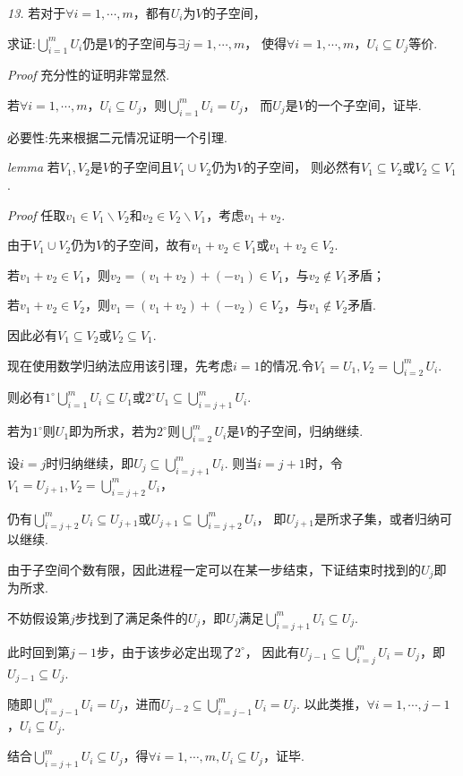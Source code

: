 \textit{13.}
若对于\(\forall i=1,\cdots,m\)，都有\(U_i\)为\(V\)的子空间，

求证:\(\bigcup_{i=1}^m U_i\)仍是\(V\)的子空间与\(\exists j=1,\cdots,m\)，
使得\(\forall i=1,\cdots,m\)，\(U_i \subseteq U_j\)等价.

\textit{Proof}
充分性的证明非常显然.

若\(\forall i=1,\cdots,m\)，\(U_i \subseteq U_j\)，则\(\bigcup_{i=1}^m U_i=U_j\)，
而\(U_j\)是\(V\)的一个子空间，证毕.

必要性:先来根据二元情况证明一个引理.

\textit{lemma}
若\(V_1,V_2\)是\(V\)的子空间且\(V_1 \cup V_2\)仍为\(V\)的子空间，
则必然有\(V_1 \subseteq V_2\)或\(V_2 \subseteq V_1\).

\textit{Proof}
任取\(v_1 \in V_1 \backslash V_2\)和\(v_2 \in V_2 \backslash V_1\)，考虑\(v_1+v_2\).

由于\(V_1 \cup V_2\)仍为\(V\)的子空间，故有\(v_1+v_2 \in V_1\)或\(v_1+v_2 \in V_2\).

若\(v_1+v_2 \in V_1\)，则\(v_2=(v_1+v_2)+(-v_1) \in V_1\)，与\(v_2 \notin V_1\)矛盾；

若\(v_1+v_2 \in V_2\)，则\(v_1=(v_1+v_2)+(-v_2) \in V_2\)，与\(v_1 \notin V_2\)矛盾.

因此必有\(V_1 \subseteq V_2\)或\(V_2 \subseteq V_1\).

现在使用数学归纳法应用该引理，先考虑\(i=1\)的情况.令\(V_1=U_1,V_2=\bigcup_{i=2}^m U_i\).

则必有\(1^{\circ}\bigcup_{i=1}^m U_i \subseteq U_1\)或\(2^{\circ}U_1 \subseteq \bigcup_{i=j+1}^m U_i\).

若为\(1^{\circ}\)则\(U_1\)即为所求，若为\(2^{\circ}\)则\(\bigcup_{i=2}^m U_i\)是\(V\)的子空间，归纳继续.

设\(i=j\)时归纳继续，即\(U_j \subseteq \bigcup_{i=j+1}^m U_i\).
则当\(i=j+1\)时，令\(V_1=U_{j+1},V_2=\bigcup_{i=j+2}^m U_i\)，

仍有\(\bigcup_{i=j+2}^m U_i \subseteq U_{j+1}\)或\(U_{j+1} \subseteq \bigcup_{i=j+2}^m U_i\)，
即\(U_{j+1}\)是所求子集，或者归纳可以继续.

由于子空间个数有限，因此进程一定可以在某一步结束，下证结束时找到的\(U_j\)即为所求.

不妨假设第\(j\)步找到了满足条件的\(U_j\)，即\(U_j\)满足\(\bigcup_{i=j+1}^m U_i\subseteq U_j\).

此时回到第\(j-1\)步，由于该步必定出现了\(2^{\circ}\)，
因此有\(U_{j-1} \subseteq \bigcup_{i=j}^m U_i=U_j\)，即\(U_{j-1} \subseteq U_j\).

随即\(\bigcup_{i=j-1}^m U_i=U_j\)，进而\(U_{j-2} \subseteq \bigcup_{i=j-1}^m U_i=U_j\).
以此类推，\(\forall i=1,\cdots,j-1\)，\(U_i\subseteq U_j\).

结合\(\bigcup_{i=j+1}^m U_i \subseteq U_j\)，得\(\forall i=1,\cdots,m,U_i \subseteq U_j\)，证毕.


